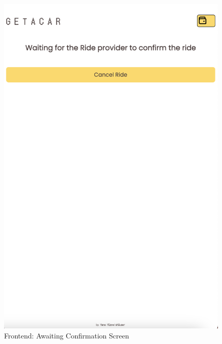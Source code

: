 \begin{figure}[h]
\begin{minipage}{0.45\linewidth}
        \includegraphics[width=\linewidth]{data/ffss/6.png}
        \caption{Frontend: Awaiting Confirmation Screen}
        \label{fig:AwaitingConfirmationScreen}
    \end{minipage}
    
\end{figure}



